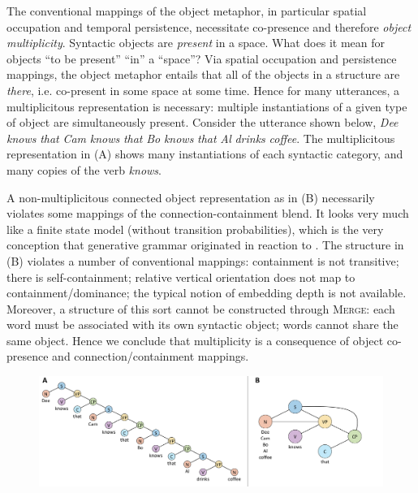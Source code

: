 The conventional mappings of the object metaphor, in particular spatial occupation and temporal persistence, necessitate co-presence and therefore \textit{object} \textit{multiplicity}. Syntactic objects are \textit{present} in a space. What does it mean for objects “to be present” “in” a “space”? Via spatial occupation and persistence mappings, the object metaphor entails that all of the objects in a structure are \textit{there}, i.e. co-present in some space at some time. Hence for many utterances, a multiplicitous representation is necessary: multiple instantiations of a given type of object are simultaneously present. Consider the utterance shown below, \textit{Dee} \textit{knows} \textit{that} \textit{Cam} \textit{knows} \textit{that} \textit{Bo} \textit{knows} \textit{that} \textit{Al} \textit{drinks} \textit{coffee}. The multiplicitous representation in (A) shows many instantiations of each syntactic category, and many copies of the verb \textit{knows}.

  A non-multiplicitous connected object representation as in (B) necessarily violates some mappings of the connection-containment blend. It looks very much like a finite state model (without transition probabilities), which is the very conception that generative grammar originated in reaction to \citep{Chomsky1956}. The structure in (B) violates a number of conventional mappings: containment is not transitive; there is self-containment; relative vertical orientation does not map to containment/dominance; the typical notion of embedding depth is not available. Moreover, a structure of this sort cannot be constructed through \textsc{Merge}: each word must be associated with its own syntactic object; words cannot share the same object. Hence we conclude that multiplicity is a consequence of object co-presence and connection/containment mappings.

  
\begin{figure}
\includegraphics[width=\textwidth]{figures/Tilsen-img36.png}
\caption{\missingcaption}
\label{fig:}
\end{figure}
 

